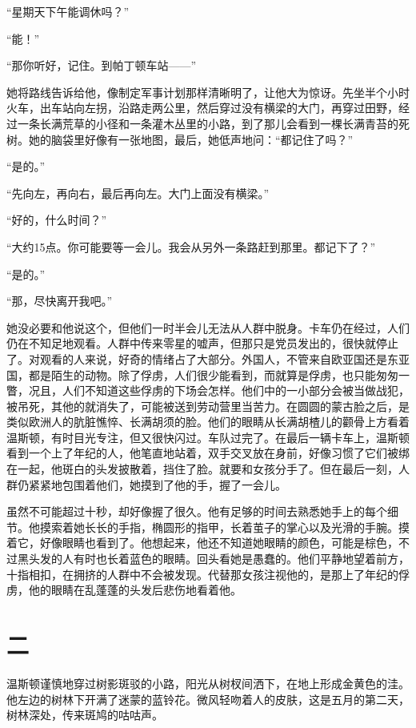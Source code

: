 ``星期天下午能调休吗？''

``能！''

``那你听好，记住。到帕丁顿车站——''

她将路线告诉给他，像制定军事计划那样清晰明了，让他大为惊讶。先坐半个小时火车，出车站向左拐，沿路走两公里，然后穿过没有横梁的大门，再穿过田野，经过一条长满荒草的小径和一条灌木丛里的小路，到了那儿会看到一棵长满青苔的死树。她的脑袋里好像有一张地图，最后，她低声地问：``都记住了吗？''

``是的。''

``先向左，再向右，最后再向左。大门上面没有横梁。''

``好的，什么时间？''

``大约15点。你可能要等一会儿。我会从另外一条路赶到那里。都记下了？''

``是的。''

``那，尽快离开我吧。''

她没必要和他说这个，但他们一时半会儿无法从人群中脱身。卡车仍在经过，人们仍在不知足地观看。人群中传来零星的嘘声，但那只是党员发出的，很快就停止了。对观看的人来说，好奇的情绪占了大部分。外国人，不管来自欧亚国还是东亚国，都是陌生的动物。除了俘虏，人们很少能看到，而就算是俘虏，也只能匆匆一瞥，况且，人们不知道这些俘虏的下场会怎样。他们中的一小部分会被当做战犯，被吊死，其他的就消失了，可能被送到劳动营里当苦力。在圆圆的蒙古脸之后，是类似欧洲人的肮脏憔悴、长满胡须的脸。他们的眼睛从长满胡楂儿的颧骨上方看着温斯顿，有时目光专注，但又很快闪过。车队过完了。在最后一辆卡车上，温斯顿看到一个上了年纪的人，他笔直地站着，双手交叉放在身前，好像习惯了它们被绑在一起，他斑白的头发披散着，挡住了脸。就要和女孩分手了。但在最后一刻，人群仍紧紧地包围着他们，她摸到了他的手，握了一会儿。

虽然不可能超过十秒，却好像握了很久。他有足够的时间去熟悉她手上的每个细节。他摸索着她长长的手指，椭圆形的指甲，长着茧子的掌心以及光滑的手腕。摸着它，好像眼睛也看到了。他想起来，他还不知道她眼睛的颜色，可能是棕色，不过黑头发的人有时也长着蓝色的眼睛。回头看她是愚蠢的。他们平静地望着前方，十指相扣，在拥挤的人群中不会被发现。代替那女孩注视他的，是那上了年纪的俘虏，他的眼睛在乱蓬蓬的头发后悲伤地看着他。

\section*{二}\label{ux5341}

温斯顿谨慎地穿过树影斑驳的小路，阳光从树杈间洒下，在地上形成金黄色的洼。他左边的树林下开满了迷蒙的蓝铃花。微风轻吻着人的皮肤，这是五月的第二天，树林深处，传来斑鸠的咕咕声。


